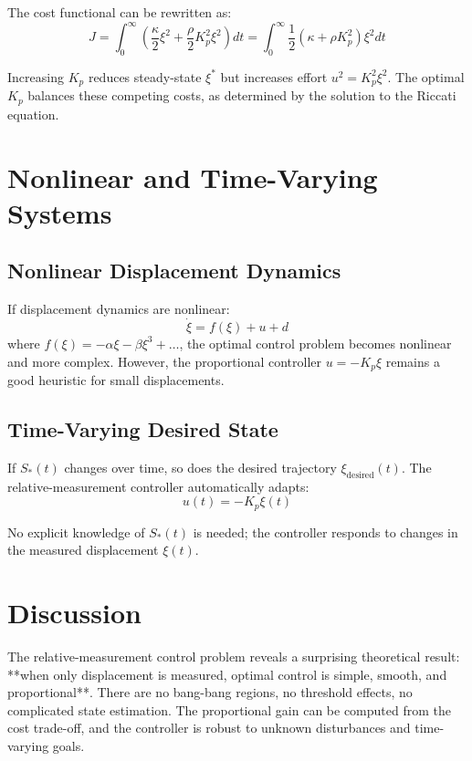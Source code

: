 \documentclass[12pt]{article}
\begin{document}
The cost functional can be rewritten as:
\begin{equation}
J = \int_0^\infty \left( \frac{\kappa}{2} \xi^2 + \frac{\rho}{2} K_p^2 \xi^2 \right) dt = \int_0^\infty \frac{1}{2} (\kappa + \rho K_p^2) \xi^2 dt
\end{equation}

Increasing $K_p$ reduces steady-state $\xi^*$ but increases effort $u^2 = K_p^2 \xi^2$. The optimal $K_p$ balances these competing costs, as determined by the solution to the Riccati equation.

\section{Nonlinear and Time-Varying Systems}

\subsection{Nonlinear Displacement Dynamics}

If displacement dynamics are nonlinear:
\begin{equation}
\dot{\xi} = f(\xi) + u + d
\end{equation}
where $f(\xi) = -\alpha \xi - \beta \xi^3 + \ldots$, the optimal control problem becomes nonlinear and more complex. However, the proportional controller $u = -K_p \xi$ remains a good heuristic for small displacements.

\subsection{Time-Varying Desired State}

If $S_*(t)$ changes over time, so does the desired trajectory $\xi_{\text{desired}}(t)$. The relative-measurement controller automatically adapts:
\begin{equation}
u(t) = -K_p \xi(t)
\end{equation}

No explicit knowledge of $S_*(t)$ is needed; the controller responds to changes in the measured displacement $\xi(t)$.

\section{Discussion}

The relative-measurement control problem reveals a surprising theoretical result: **when only displacement is measured, optimal control is simple, smooth, and proportional**. There are no bang-bang regions, no threshold effects, no complicated state estimation. The proportional gain can be computed from the cost trade-off, and the controller is robust to unknown disturbances and time-varying goals.
\end{document}
